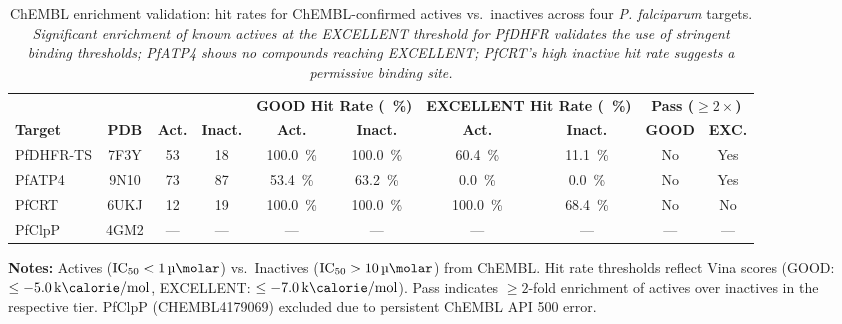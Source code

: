 \documentclass[journal=jcisd8,manuscript=suppinfo]{achemso}
\begin{document}
\begin{table}[ht]
\centering
\caption{ChEMBL enrichment validation: hit rates for ChEMBL-confirmed actives vs.\ inactives across four \emph{P. falciparum} targets. \textit{Significant enrichment of known actives at the EXCELLENT threshold for PfDHFR validates the use of stringent binding thresholds; PfATP4 shows no compounds reaching EXCELLENT; PfCRT's high inactive hit rate suggests a permissive binding site.}}
\label{tab:sm_s18b_chembl_enrichment}
\scriptsize
\begin{tabular}{lccccccccc}
\toprule
& & & & \multicolumn{2}{c|}{\textbf{GOOD Hit Rate (\qty{}{\percent})}} & \multicolumn{2}{c|}{\textbf{EXCELLENT Hit Rate (\qty{}{\percent})}} & \multicolumn{2}{c}{\textbf{Pass ($\geq \num{2}\times$)}} \\
\textbf{Target} & \textbf{PDB} & \textbf{Act.} & \textbf{Inact.} & \textbf{Act.} & \textbf{Inact.} & \textbf{Act.} & \textbf{Inact.} & \textbf{GOOD} & \textbf{EXC.} \\
\midrule
PfDHFR-TS & 7F3Y & \num{53} & \num{18} & \qty{100.0}{\percent} & \qty{100.0}{\percent} & \qty{60.4}{\percent} & \qty{11.1}{\percent} & No & Yes \\
PfATP4 & 9N10 & \num{73} & \num{87} & \qty{53.4}{\percent} & \qty{63.2}{\percent} & \qty{0.0}{\percent} & \qty{0.0}{\percent} & No & Yes \\
PfCRT & 6UKJ & \num{12} & \num{19} & \qty{100.0}{\percent} & \qty{100.0}{\percent} & \qty{100.0}{\percent} & \qty{68.4}{\percent} & No & No \\
PfClpP & 4GM2 & --- & --- & --- & --- & --- & --- & --- & --- \\
\bottomrule
\end{tabular}
\end{table}

\noindent\textbf{Notes:} Actives ($\text{IC}_{\num{50}} < \qty{1}{\micro\molar}$) vs.\ Inactives ($\text{IC}_{\num{50}} > \qty{10}{\micro\molar}$) from ChEMBL. Hit rate thresholds reflect Vina scores (GOOD: $\leq \qty{-5.0}{\kilo\calorie\per\mole}$, EXCELLENT: $\leq \qty{-7.0}{\kilo\calorie\per\mole}$). Pass indicates $\geq \num{2}$-fold enrichment of actives over inactives in the respective tier. PfClpP (CHEMBL4179069) excluded due to persistent ChEMBL API 500 error.
\end{document}
